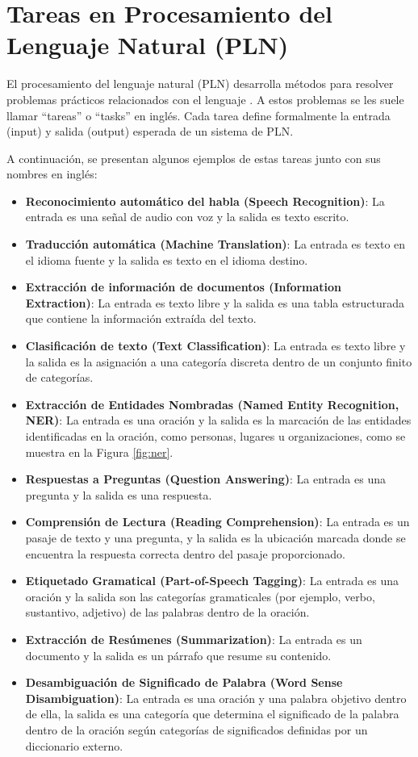 \section{Tareas en Procesamiento del Lenguaje Natural (PLN)}

El procesamiento del lenguaje natural (PLN) desarrolla métodos para resolver problemas prácticos relacionados con el lenguaje \cite{JohnsonMLSS}. A estos problemas se les suele llamar ``tareas'' o ``tasks'' en inglés. Cada tarea define formalmente la entrada (input) y salida (output) esperada de un sistema de PLN.

A continuación, se presentan algunos ejemplos de estas tareas junto con sus nombres en inglés:

\begin{itemize}
  \item \textbf{Reconocimiento automático del habla (Speech Recognition)}: La entrada es una señal de audio con voz y la salida es texto escrito.
  \item \textbf{Traducción automática (Machine Translation)}: La entrada es texto en el idioma fuente y la salida es texto en el idioma destino.
  \item \textbf{Extracción de información de documentos (Information Extraction)}: La entrada es texto libre y la salida es una tabla estructurada que contiene la información extraída del texto.
  \item \textbf{Clasificación de texto (Text Classification)}: La entrada es texto libre y la salida es la asignación a una categoría discreta dentro de un conjunto finito de categorías.
  \item \textbf{Extracción de Entidades Nombradas (Named Entity Recognition, NER)}: La entrada es una oración y la salida es la marcación de las entidades identificadas en la oración, como personas, lugares u organizaciones, como se muestra en la Figura \ref{fig:ner}.
  \item \textbf{Respuestas a Preguntas (Question Answering)}: La entrada es una pregunta y la salida es una respuesta.
  \item \textbf{Comprensión de Lectura (Reading Comprehension)}: La entrada es un pasaje de texto y una pregunta, y la salida es la ubicación marcada donde se encuentra la respuesta correcta dentro del pasaje proporcionado.
  \item \textbf{Etiquetado Gramatical (Part-of-Speech Tagging)}: La entrada es una oración y la salida son las categorías gramaticales (por ejemplo, verbo, sustantivo, adjetivo) de las palabras dentro de la oración.
  \item \textbf{Extracción de Resúmenes (Summarization)}: La entrada es un documento y la salida es un párrafo que resume su contenido.
  \item \textbf{Desambiguación de Significado de Palabra (Word Sense Disambiguation)}: La entrada es una oración y una palabra objetivo dentro de ella, la salida es una categoría que determina el  significado de la palabra dentro de la oración según categorías de significados definidas por un diccionario externo.

\end{itemize}

